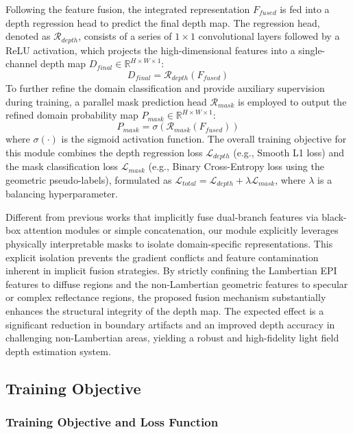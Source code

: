 Following the feature fusion, the integrated representation $F_{fused}$ is fed into a depth regression head to predict the final depth map. The regression head, denoted as $\mathcal{R}_{depth}$, consists of a series of $1 \times 1$ convolutional layers followed by a ReLU activation, which projects the high-dimensional features into a single-channel depth map $D_{final} \in \mathbb{R}^{H \times W \times 1}$:
\begin{equation}
\label{eq:eq23}
D_{final} = \mathcal{R}_{depth}(F_{fused})
\end{equation}
To further refine the domain classification and provide auxiliary supervision during training, a parallel mask prediction head $\mathcal{R}_{mask}$ is employed to output the refined domain probability map $P_{mask} \in \mathbb{R}^{H \times W \times 1}$:
\begin{equation}
\label{eq:eq24}
P_{mask} = \sigma(\mathcal{R}_{mask}(F_{fused}))
\end{equation}
where $\sigma(\cdot)$ is the sigmoid activation function. The overall training objective for this module combines the depth regression loss $\mathcal{L}_{depth}$ (e.g., Smooth L1 loss) and the mask classification loss $\mathcal{L}_{mask}$ (e.g., Binary Cross-Entropy loss using the geometric pseudo-labels), formulated as $\mathcal{L}_{total} = \mathcal{L}_{depth} + \lambda \mathcal{L}_{mask}$, where $\lambda$ is a balancing hyperparameter.

Different from previous works that implicitly fuse dual-branch features via black-box attention modules or simple concatenation, our module explicitly leverages physically interpretable masks to isolate domain-specific representations. This explicit isolation prevents the gradient conflicts and feature contamination inherent in implicit fusion strategies. By strictly confining the Lambertian EPI features to diffuse regions and the non-Lambertian geometric features to specular or complex reflectance regions, the proposed fusion mechanism substantially enhances the structural integrity of the depth map. The expected effect is a significant reduction in boundary artifacts and an improved depth accuracy in challenging non-Lambertian areas, yielding a robust and high-fidelity light field depth estimation system.

\subsection{Training Objective}

\subsubsection{Training Objective and Loss Function}

